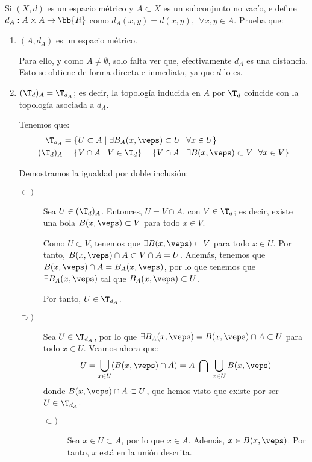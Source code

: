 \begin{ejercicio}
    Si $(X,d)$ es un espacio métrico y $A\subset X$ es un subconjunto no vacío, e define $d_A:A\times A\to \bb{R}$ como $d_A(x,y)=d(x,y),~~\forall x,y\in A$. Prueba que:
    \begin{enumerate}
        \item $(A,d_A)$ es un espacio métrico.

        Para ello, y como $A\neq \emptyset$, solo falta ver que, efectivamente $d_A$ es una distancia. Esto se obtiene de forma directa e inmediata, ya que $d$ lo es.
        
        \item $(\T_d)_A=\T_{d_A}$; es decir, la topología inducida en $A$ por $\T_d$ coincide con la topología asociada a $d_A$.

        Tenemos que:
        \begin{equation*}\begin{split}
            \T_{d_A}&=\{U\subset A\mid \exists B_A(x,\veps)\subset U~~ \forall x\in U\}\\
            (\T_d)_A &= \{V\cap A\mid V\in \T_d\}
            = \{V\cap A\mid \exists B(x,\veps)\subset V~~ \forall x\in V\}
        \end{split}\end{equation*}

        Demostramos la igualdad por doble inclusión:
        \begin{description}
            \item[$\subset)$]

            Sea $U\in (\T_d)_A$. Entonces, $U=V\cap A$, con $V\in \T_d$; es decir, existe una bola $B(x,\veps)\subset V$ para todo $x\in V$.

            Como $U\subset V$, tenemos que $\exists B(x,\veps)\subset V$ para todo $x\in U$. Por tanto, $B(x,\veps)\cap A\subset V\cap A=U$. Además, tenemos que $B(x,\veps)\cap A=B_A(x,\veps)$, por lo que tenemos que $\exists B_A(x,\veps)$ tal que $B_A(x,\veps)\subset U$.
            
            Por tanto, $U\in \T_{d_A}$.

            \item[$\supset)$] Sea $U\in \T_{d_A}$, por lo que $\exists B_A(x,\veps)=B(x,\veps)\cap A\subset U$ para todo $x\in U$. Veamos ahora que:
            \begin{equation*}
                U=\bigcup_{x\in U}(B(x,\veps) \cap A) = A~\bigcap~\bigcup_{x\in U}B(x,\veps)
            \end{equation*}
            donde $B(x,\veps)\cap A\subset U$, que hemos visto que existe por ser $U\in \T_{d_A}$.
            \begin{description}
                \item[$\subset)$] Sea $x\in U\subset A$, por lo que $x\in A$. Además, $x\in B(x,\veps)$. Por tanto, $x$ está en la unión descrita.
                

\end{description}
\end{description}
\end{enumerate}
\end{ejercicio}
